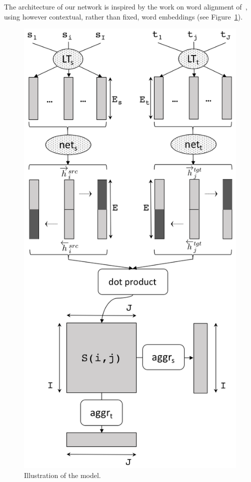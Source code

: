 \documentclass[11pt,a4paper]{article}
\begin{document}
The architecture of our network is inspired by the work on word alignment of~\citet{W16-2207}, using however contextual, rather than fixed, word embeddings (see Figure~\ref{network}).
\begin{figure}[h]
\center
    \includegraphics[width=0.8\linewidth]{network}
    \caption{Illustration of the model.} 
    \label{network}
\end{figure}
 
\end{document}
